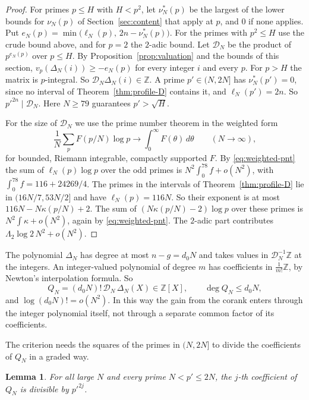 \documentclass[11pt]{amsart}
\newtheorem{lemma}[theorem]{Lemma}
\theoremstyle{definition}
\theoremstyle{remark}
\numberwithin{equation}{section}
\newcommand{\Z}{\mathbb Z}
\newcommand{\cD}{\mathcal D}
\begin{document}
\begin{proof}
For primes $p\le H$ with $H<p^2$, let $\nu^*_N(p)$ be the largest of the lower bounds for $\nu_N(p)$ of
Section~\ref{sec:content} that apply at $p$, and $0$ if none applies. Put
$e_N(p)=\min\bigl(\ell_N(p),\,2n-\nu^*_N(p)\bigr)$. For the primes with $p^2\le H$ use the crude bound
above, and for $p=2$ the $2$-adic bound. Let $\cD_N$ be the product of $p^{e_N(p)}$ over $p\le H$. By
Proposition~\ref{prop:valuation} and the bounds of this section, $v_p(\Delta_N(i))\ge-e_N(p)$ for every
integer $i$ and every $p$. For $p>H$ the matrix is $p$-integral. So $\cD_N\Delta_N(i)\in\Z$. A prime
$p'\in(N,2N]$ has $\nu^*_N(p')=0$, since no interval of Theorem~\ref{thm:profile-D} contains it, and
$\ell_N(p')=2n$. So $p'^{2n}\mid\cD_N$. Here $N\ge79$ guarantees $p'>\sqrt H$.

For the size of $\cD_N$ we use the prime number theorem in the weighted form
\begin{equation}\label{eq:weighted-pnt}
 \frac1N\sum_{p}F(p/N)\log p\longrightarrow\int_0^\infty F(\theta)\,d\theta\qquad(N\to\infty),
\end{equation}
for bounded, Riemann integrable, compactly supported $F$. By \eqref{eq:weighted-pnt} the sum of
$\ell_N(p)\log p$ over the odd primes is $N^2\int_0^{78}f+o(N^2)$, with $\int_0^{78}f=116+24269/4$. The primes in
the intervals of Theorem~\ref{thm:profile-D} lie in $(16N/7,53N/2]$ and have $\ell_N(p)=116N$. So their
exponent is at most $116N-N\kappa(p/N)+2$. The sum of $(N\kappa(p/N)-2)\log p$ over these primes is
$N^2\int\kappa+o(N^2)$, again by \eqref{eq:weighted-pnt}. The $2$-adic part contributes
$\Lambda_2\log2\,N^2+o(N^2)$.
\end{proof}

The polynomial $\Delta_N$ has degree at most $n-g=d_0N$ and takes values in $\cD_N^{-1}\Z$ at the integers.
An integer-valued polynomial of degree $m$ has coefficients in $\frac1{m!}\Z$, by Newton's interpolation
formula. So
\begin{equation}\label{eq:QN}
 Q_N=(d_0N)!\,\cD_N\,\Delta_N(X)\in\Z[X],\qquad \deg Q_N\le d_0N,
\end{equation}
and $\log(d_0N)!=o(N^2)$. In this way the gain from the corank enters through the integer polynomial
itself, not through a separate common factor of its coefficients.

The criterion needs the squares of the primes in $(N,2N]$ to divide the coefficients of $Q_N$ in a graded
way.

\begin{lemma}\label{lem:squares}
For all large $N$ and every prime $N<p'\le2N$, the $j$-th coefficient of $Q_N$ is divisible by $p'^{2j}$.
\end{lemma}
\end{document}
